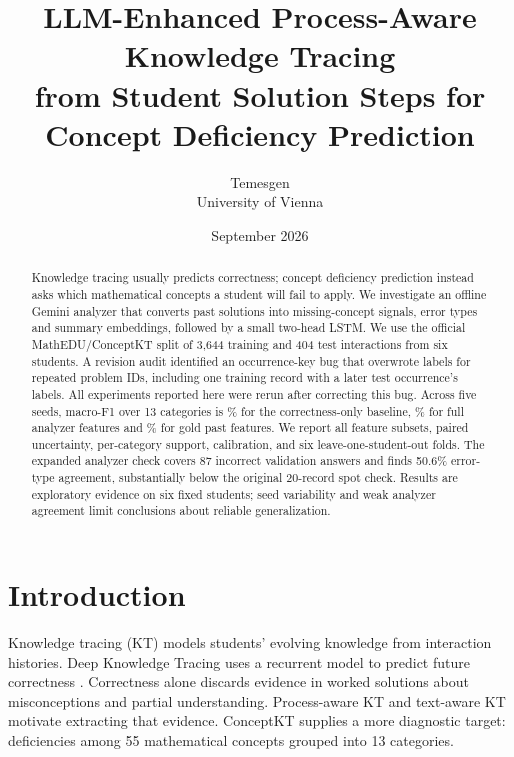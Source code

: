 \documentclass[11pt]{article}
\title{\bfseries LLM-Enhanced Process-Aware Knowledge Tracing\\from Student Solution Steps for Concept Deficiency Prediction}
\author{Temesgen\\[2pt]\normalsize University of Vienna}
\date{September 2026}
\begin{document}
\maketitle
\begin{abstract}
Knowledge tracing usually predicts correctness; concept deficiency prediction instead asks which mathematical concepts a student will fail to apply. We investigate an offline Gemini analyzer that converts past solutions into missing-concept signals, error types and summary embeddings, followed by a small two-head LSTM. We use the official MathEDU/ConceptKT split of 3,644 training and 404 test interactions from six students. A revision audit identified an occurrence-key bug that overwrote labels for repeated problem IDs, including one training record with a later test occurrence's labels. All experiments reported here were rerun after correcting this bug. Across five seeds, macro-F1 over 13 categories is \FoneA\% for the correctness-only baseline, \FoneB\% for full analyzer features and \FoneC\% for gold past features. We report all feature subsets, paired uncertainty, per-category support, calibration, and six leave-one-student-out folds. The expanded analyzer check covers 87 incorrect validation answers and finds 50.6\% error-type agreement, substantially below the original 20-record spot check. Results are exploratory evidence on six fixed students; seed variability and weak analyzer agreement limit conclusions about reliable generalization.
\end{abstract}

\section{Introduction}
Knowledge tracing (KT) models students' evolving knowledge from interaction histories. Deep Knowledge Tracing uses a recurrent model to predict future correctness \cite{piech2015dkt}. Correctness alone discards evidence in worked solutions about misconceptions and partial understanding. Process-aware KT \cite{huang2024remembering,park2025statuskt} and text-aware KT \cite{lee2024lkt,ozyurt2024kcqrl} motivate extracting that evidence. ConceptKT \cite{kang2026conceptkt} supplies a more diagnostic target: deficiencies among 55 mathematical concepts grouped into 13 categories.
\end{document}
